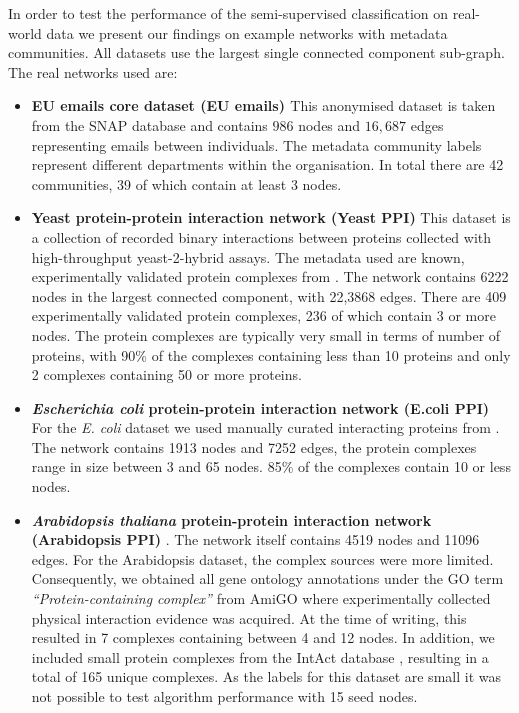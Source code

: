 \documentclass[sigconf]{acmart}
\begin{document}
In order to test the performance of the semi-supervised classification on real-world data we present our findings on example networks with metadata communities.
All datasets use the largest single connected component sub-graph.
The real networks used are:
\begin{itemize}
 \item \textbf{EU emails core dataset (EU emails) \cite{leskovec2007graph}} This anonymised dataset is taken from the SNAP database \cite{snapnets} and contains $986$ nodes and $16,687$ edges representing emails between individuals.
 The metadata community labels represent different departments within the organisation.
 In total there are 42 communities, 39 of which contain at least 3 nodes.
 
 \item \textbf{Yeast protein-protein interaction network (Yeast PPI)} \cite{yu2008high}
 This dataset is a collection of recorded binary interactions between proteins collected with high-throughput yeast-2-hybrid assays.
 The metadata used are known, experimentally validated protein complexes from \cite{pu2008up}.
 The network contains 6222 nodes in the largest connected component, with 22,3868 edges.
 There are 409 experimentally validated protein complexes, 236 of which contain 3 or more nodes.
 The protein complexes are typically very small in terms of number of proteins, with  90\% of the complexes containing less than 10 proteins and only 2 complexes containing 50 or more proteins.

  \item \textbf{\textit{Escherichia coli} protein-protein interaction network (E.coli PPI) \cite{su2007bacteriome}}
  For the \textit{E. coli} dataset we used manually curated interacting proteins from \cite{su2007bacteriome}.
  The network contains 1913 nodes and 7252 edges, the protein complexes range in size between 3 and 65 nodes.
  85\% of the complexes contain 10 or less nodes.
 
 \item \textbf{\textit{Arabidopsis thaliana} protein-protein interaction network (Arabidopsis PPI)} \cite{ArabidopsisConsortium2011}.
  The network itself contains 4519 nodes and 11096 edges.
  For the Arabidopsis dataset, the complex sources were more limited.
  Consequently, we obtained all gene ontology annotations under the GO term \textit{``Protein-containing complex''} from AmiGO \cite{carbon2009amigo} where experimentally collected physical interaction evidence was acquired.
  At the time of writing, this resulted in 7 complexes containing between 4 and 12 nodes.
  In addition, we included small protein complexes from the IntAct database \cite{orchard2013mintact}, resulting in a total of 165 unique complexes.
  As the labels for this dataset are small it was not possible to test algorithm performance with 15 seed nodes.
  
\end{itemize}
\end{document}

